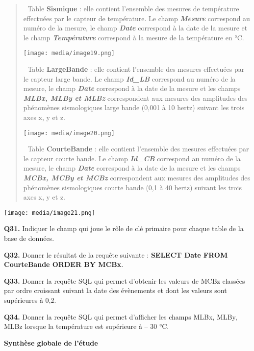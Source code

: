 \documentclass[]{article}
\begin{document}
\begin{quote}
\textbf{} Table \textbf{Sismique} : elle contient l'ensemble des
mesures de température effectuées par le capteur de température. Le
champ \emph{\textbf{\emph{Mesure}}} correspond au numéro de la mesure,
le champ \emph{\textbf{Date}} correspond à la date de la mesure et le
champ \emph{\textbf{Température}} correspond à la mesure de la
température en °C.

\texttt{[image: media/image19.png]}

\textbf{} Table \textbf{LargeBande} : elle contient l'ensemble des
mesures effectuées par le capteur large bande. Le champ
\emph{\textbf{\emph{Id\_LB}}} correspond au numéro de la mesure, le
champ \emph{\textbf{Date}} correspond à la date de la mesure et les
champs \emph{\textbf{MLBx, MLBy et MLBz}} correspondent aux mesures des
amplitudes des phénomènes sismologiques large bande (0,001 à 10 hertz)
suivant les trois axes x, y et z.

\texttt{[image: media/image20.png]}

\textbf{} Table \textbf{CourteBande} : elle contient l'ensemble des
mesures effectuées par le capteur courte bande. Le champ
\emph{\textbf{\emph{Id\_CB}}} correspond au numéro de la mesure, le
champ \emph{\textbf{Date}} correspond à la date de la mesure et les
champs \emph{\textbf{MCBx, MCBy et MCBz}} correspondent aux mesures des
amplitudes des phénomènes sismologiques courte bande (0,1 à 40 hertz)
suivant les trois axes x, y et z.
\end{quote}

\texttt{[image: media/image21.png]}

\textbf{Q31.} Indiquer le champ qui joue le rôle de clé primaire pour
chaque table de la base de données.

\textbf{Q32.} Donner le résultat de la requête suivante : \textbf{SELECT
Date FROM CourteBande ORDER BY MCBx}.

\protect\hypertarget{page16}{}{}\textbf{Q33.} Donner la requête SQL qui
permet d'obtenir les valeurs de MCBz classées par ordre croissant
suivant la date des évènements et dont les valeurs sont supérieures à
0,2.

\textbf{Q34.} Donner la requête SQL qui permet d'afficher les champs
MLBx, MLBy, MLBz lorsque la température est supérieure à -- 30 °C.

\textbf{Synthèse globale de l'étude}
\end{document}
